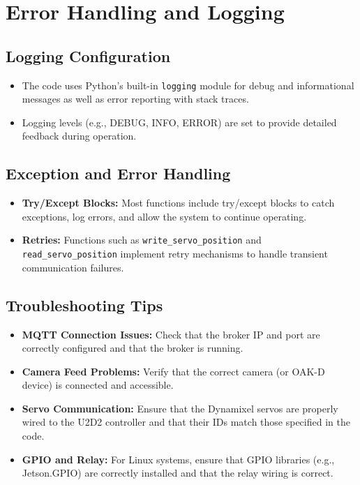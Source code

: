 \documentclass[12pt]{article}
\begin{document}
\section{Error Handling and Logging}

\subsection{Logging Configuration}
\begin{itemize}[leftmargin=*, label={--}]
    \item The code uses Python's built-in \texttt{logging} module for debug and informational messages as well as error reporting with stack traces.
    \item Logging levels (e.g., DEBUG, INFO, ERROR) are set to provide detailed feedback during operation.
\end{itemize}

\subsection{Exception and Error Handling}
\begin{itemize}[leftmargin=*, label={--}]
    \item \textbf{Try/Except Blocks:} Most functions include try/except blocks to catch exceptions, log errors, and allow the system to continue operating.
    \item \textbf{Retries:} Functions such as \texttt{write\_servo\_position} and \texttt{read\_servo\_position} implement retry mechanisms to handle transient communication failures.
\end{itemize}

\subsection{Troubleshooting Tips}
\begin{itemize}[leftmargin=*, label={--}]
    \item \textbf{MQTT Connection Issues:} Check that the broker IP and port are correctly configured and that the broker is running.
    \item \textbf{Camera Feed Problems:} Verify that the correct camera (or OAK-D device) is connected and accessible.
    \item \textbf{Servo Communication:} Ensure that the Dynamixel servos are properly wired to the U2D2 controller and that their IDs match those specified in the code.
    \item \textbf{GPIO and Relay:} For Linux systems, ensure that GPIO libraries (e.g., Jetson.GPIO) are correctly installed and that the relay wiring is correct.
\end{itemize}
\end{document}
